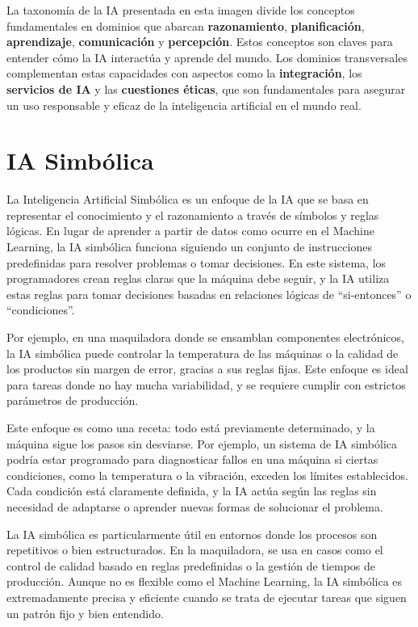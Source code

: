 \documentclass[
  10pt,
  letterpaper,
]{book}
\begin{document}
La taxonomía de la IA presentada en esta imagen divide los conceptos
fundamentales en dominios que abarcan \textbf{razonamiento},
\textbf{planificación}, \textbf{aprendizaje}, \textbf{comunicación} y
\textbf{percepción}. Estos conceptos son claves para entender cómo la IA
interactúa y aprende del mundo. Los dominios transversales complementan
estas capacidades con aspectos como la \textbf{integración}, los
\textbf{servicios de IA} y las \textbf{cuestiones éticas}, que son
fundamentales para asegurar un uso responsable y eficaz de la
inteligencia artificial en el mundo real.

\section{IA Simbólica}\label{ia-simbuxf3lica}

La Inteligencia Artificial Simbólica es un enfoque de la IA que se basa
en representar el conocimiento y el razonamiento a través de símbolos y
reglas lógicas. En lugar de aprender a partir de datos como ocurre en el
Machine Learning, la IA simbólica funciona siguiendo un conjunto de
instrucciones predefinidas para resolver problemas o tomar decisiones.
En este sistema, los programadores crean reglas claras que la máquina
debe seguir, y la IA utiliza estas reglas para tomar decisiones basadas
en relaciones lógicas de ``si-entonces'' o ``condiciones''.

Por ejemplo, en una maquiladora donde se ensamblan componentes
electrónicos, la IA simbólica puede controlar la temperatura de las
máquinas o la calidad de los productos sin margen de error, gracias a
sus reglas fijas. Este enfoque es ideal para tareas donde no hay mucha
variabilidad, y se requiere cumplir con estrictos parámetros de
producción.

Este enfoque es como una receta: todo está previamente determinado, y la
máquina sigue los pasos sin desviarse. Por ejemplo, un sistema de IA
simbólica podría estar programado para diagnosticar fallos en una
máquina si ciertas condiciones, como la temperatura o la vibración,
exceden los límites establecidos. Cada condición está claramente
definida, y la IA actúa según las reglas sin necesidad de adaptarse o
aprender nuevas formas de solucionar el problema.

La IA simbólica es particularmente útil en entornos donde los procesos
son repetitivos o bien estructurados. En la maquiladora, se usa en casos
como el control de calidad basado en reglas predefinidas o la gestión de
tiempos de producción. Aunque no es flexible como el Machine Learning,
la IA simbólica es extremadamente precisa y eficiente cuando se trata de
ejecutar tareas que siguen un patrón fijo y bien entendido.
\end{document}
